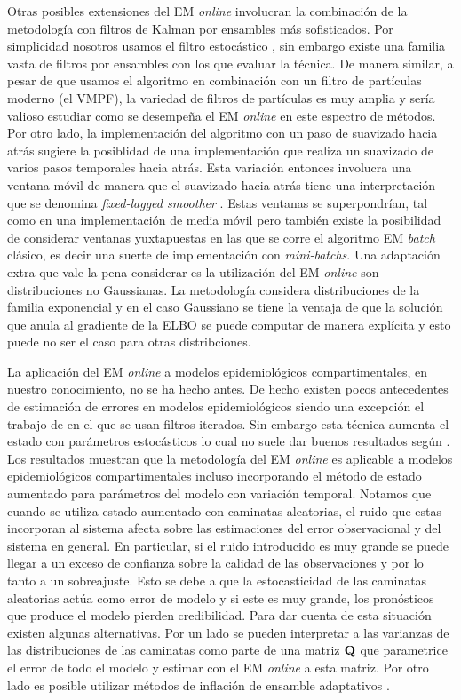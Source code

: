 Otras posibles extensiones del EM \textit{online} involucran la combinación de la metodología con filtros de Kalman por ensambles más sofisticados. Por simplicidad nosotros usamos el filtro estocástico \citep{Burgers1998}, sin embargo existe una familia vasta de filtros por ensambles con los que evaluar la técnica. De manera similar, a pesar de que usamos el algoritmo en combinación con un filtro de partículas moderno (el VMPF), la variedad de filtros de partículas es muy amplia y sería valioso estudiar como se desempeña el EM \textit{online} en este espectro de métodos. Por otro lado, la implementación del algoritmo con un paso de suavizado hacia atrás sugiere la posiblidad de una implementación que realiza un suavizado de varios pasos temporales hacia atrás. Esta variación entonces involucra una ventana móvil de manera que el suavizado hacia atrás tiene una interpretación que se denomina \textit{fixed-lagged smoother} \citep{Cosme2012}. Estas ventanas se superpondrían, tal como en una implementación de media móvil pero también existe la posibilidad de considerar ventanas yuxtapuestas en las que se corre el algoritmo EM \textit{batch} clásico, es decir una suerte de implementación con \textit{mini-batchs}. Una adaptación extra que vale la pena considerar es la utilización del EM \textit{online} son distribuciones no Gaussianas. La metodología considera distribuciones de la familia exponencial y en el caso Gaussiano se tiene la ventaja de que la solución que anula al gradiente de la ELBO se puede computar de manera explícita y esto puede no ser el caso para otras distribciones.

La aplicación del EM \textit{online} a modelos epidemiológicos compartimentales, en nuestro conocimiento, no se ha hecho antes. De hecho existen pocos antecedentes de estimación de errores en modelos epidemiológicos siendo una excepción el trabajo de \cite{Ionides2006} en el que se usan filtros iterados. Sin embargo esta técnica aumenta el estado con parámetros estocásticos lo cual no suele dar buenos resultados según \cite{Delsole2010}. Los resultados muestran que la metodología del EM \textit{online} es aplicable a modelos epidemiológicos compartimentales incluso incorporando el método de estado aumentado para parámetros del modelo con variación temporal. Notamos que cuando se utiliza estado aumentado con caminatas aleatorias, el ruido que estas incorporan al sistema afecta sobre las estimaciones del error observacional y del sistema en general. En particular, si el ruido introducido es muy grande se puede llegar a un exceso de confianza sobre la calidad de las observaciones y por lo tanto a un sobreajuste. Esto se debe a que la estocasticidad de las caminatas aleatorias actúa como error de modelo y si este es muy grande, los pronósticos que produce el modelo pierden credibilidad. Para dar cuenta de esta situación existen algunas alternativas. Por un lado se pueden interpretar a las varianzas de las distribuciones de las caminatas como parte de una matriz $\mathbf{Q}$ que parametrice el error de todo el modelo y estimar con el EM \textit{online} a esta matriz. Por otro lado es posible utilizar métodos de inflación de ensamble adaptativos \citep{Ruiz2013b}.

